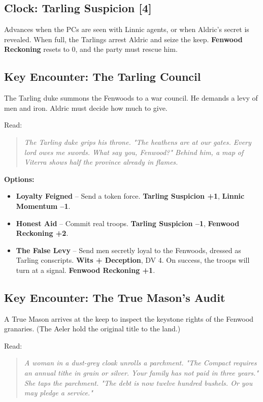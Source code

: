 \documentclass[11pt]{book}
\begin{document}
\subsection*{Clock: Tarling Suspicion [4]}
Advances when the PCs are seen with Linnic agents, or when Aldric's secret is revealed. When full, the Tarlings arrest Aldric and seize the keep. \textbf{Fenwood Reckoning} resets to 0, and the party must rescue him.

\subsection*{Key Encounter: The Tarling Council}
The Tarling duke summons the Fenwoods to a war council. He demands a levy of men and iron. Aldric must decide how much to give.

Read:
\begin{quote}
\emph{The Tarling duke grips his throne. "The heathens are at our gates. Every lord owes me swords. What say you, Fenwood?" Behind him, a map of Viterra shows half the province already in flames.}
\end{quote}

\textbf{Options:}
\begin{itemize}
    \item \textbf{Loyalty Feigned} -- Send a token force. \textbf{Tarling Suspicion +1}, \textbf{Linnic Momentum --1}.
    \item \textbf{Honest Aid} -- Commit real troops. \textbf{Tarling Suspicion --1}, \textbf{Fenwood Reckoning +2}.
    \item \textbf{The False Levy} -- Send men secretly loyal to the Fenwoods, dressed as Tarling conscripts. \textbf{Wits + Deception}, DV 4. On success, the troops will turn at a signal. \textbf{Fenwood Reckoning +1}.
\end{itemize}

\subsection*{Key Encounter: The True Mason's Audit}
A True Mason arrives at the keep to inspect the keystone rights of the Fenwood granaries. (The Aeler hold the original title to the land.)

Read:
\begin{quote}
\emph{A woman in a dust-grey cloak unrolls a parchment. "The Compact requires an annual tithe in grain or silver. Your family has not paid in three years." She taps the parchment. "The debt is now twelve hundred bushels. Or you may pledge a service."}
\end{quote}
\end{document}
